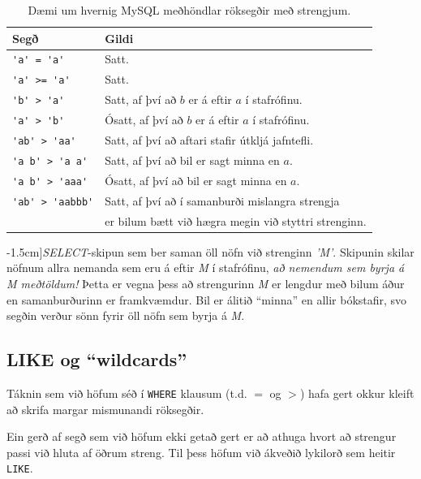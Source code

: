 \begin{table}
\centering
\caption[Röksegðir með strengjum]{Dæmi um hvernig MySQL meðhöndlar röksegðir með strengjum.}
\label{tafla:samanburdir-strengir}
\begin{tabular}{ll}
\toprule
Segð&Gildi\\
\midrule
\verb|'a' = 'a'|&Satt.\\
\verb|'a' >= 'a'|&Satt.\\
\verb|'b' > 'a'|&Satt, af því að $b$ er á eftir $a$ í stafrófinu.\\
\verb|'a' > 'b'|&Ósatt, af því að $b$ er á eftir $a$ í stafrófinu.\\
\verb|'ab' > 'aa'|&Satt, af því að aftari stafir útkljá jafntefli.\\
\verb|'a b' > 'a a'|&Satt, af því að bil er sagt minna en $a$.\\
\verb|'a b' > 'aaa'|&Ósatt, af því að bil er sagt minna en $a$.\\
\verb|'ab' > 'aabbb'|&Satt, af því að í samanburði mislangra strengja\\
&er bilum bætt við hægra megin við styttri strenginn.\\
\bottomrule
\end{tabular}
\end{table}

\begin{example}
\caption[Stærra-en samanburður við streng][-1.5cm]{\emph{SELECT}-skipun sem ber saman öll nöfn við strenginn \emph{'M'}. Skipunin skilar nöfnum allra nemanda sem eru á eftir \emph{M} í stafrófinu, \emph{að nemendum sem byrja á M meðtöldum!} Þetta er vegna þess að strengurinn \emph{M} er lengdur með bilum áður en samanburðurinn er framkvæmdur. Bil er álitið ``minna'' en allir bókstafir, svo segðin verður sönn fyrir öll nöfn sem byrja á \emph{M}.}
\label{sql:k4d7-where-nafn-staerra-en}
\centering
{}
\end{example}

\subsection{LIKE og ``wildcards''}
Táknin sem við höfum séð í \verb|WHERE| klausum (t.d. $=$ og $>$) hafa gert okkur kleift að skrifa margar mismunandi röksegðir.

Ein gerð af segð sem við höfum ekki getað gert er að athuga hvort að strengur passi við hluta af öðrum streng. Til þess höfum við ákveðið lykilorð sem heitir \verb|LIKE|.

